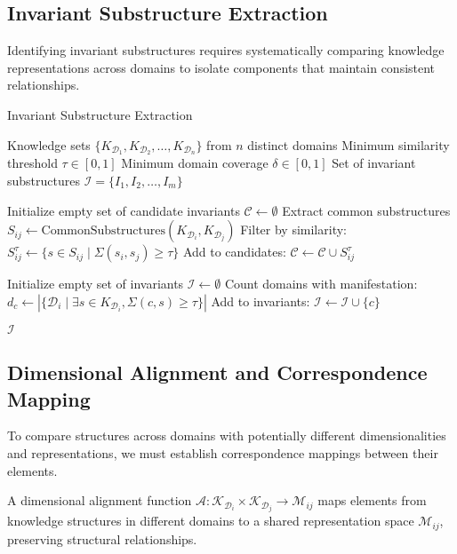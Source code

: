 \subsection{Invariant Substructure Extraction}

Identifying invariant substructures requires systematically comparing knowledge representations across domains to isolate components that maintain consistent relationships.

\begin{algorithm}
\caption{Invariant Substructure Extraction}
\begin{algorithmic}[1]
\Require Knowledge sets $\{K_{\mathcal{D}_1}, K_{\mathcal{D}_2}, \ldots, K_{\mathcal{D}_n}\}$ from $n$ distinct domains
\Require Minimum similarity threshold $\tau \in [0,1]$
\Require Minimum domain coverage $\delta \in [0,1]$
\Ensure Set of invariant substructures $\mathcal{I} = \{I_1, I_2, \ldots, I_m\}$

\State Initialize empty set of candidate invariants $\mathcal{C} \gets \emptyset$
    \State Extract common substructures $S_{ij} \gets \text{CommonSubstructures}(K_{\mathcal{D}_i}, K_{\mathcal{D}_j})$
    \State Filter by similarity: $S_{ij}^{\tau} \gets \{s \in S_{ij} \mid \Sigma(s_i, s_j) \geq \tau\}$
    \State Add to candidates: $\mathcal{C} \gets \mathcal{C} \cup S_{ij}^{\tau}$
\EndFor

\State Initialize empty set of invariants $\mathcal{I} \gets \emptyset$
    \State Count domains with manifestation: $d_c \gets |\{\mathcal{D}_i \mid \exists s \in K_{\mathcal{D}_i}, \Sigma(c, s) \geq \tau\}|$
        \State Add to invariants: $\mathcal{I} \gets \mathcal{I} \cup \{c\}$
    \EndIf
\EndFor

\State \Return $\mathcal{I}$
\end{algorithmic}
\end{algorithm}

\subsection{Dimensional Alignment and Correspondence Mapping}

To compare structures across domains with potentially different dimensionalities and representations, we must establish correspondence mappings between their elements.

\begin{definition}
A dimensional alignment function $\mathcal{A}: \mathcal{K}_{\mathcal{D}_i} \times \mathcal{K}_{\mathcal{D}_j} \rightarrow \mathcal{M}_{ij}$ maps elements from knowledge structures in different domains to a shared representation space $\mathcal{M}_{ij}$, preserving structural relationships.
\end{definition}

